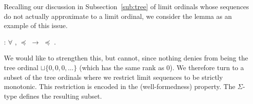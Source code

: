 Recalling our discussion in Subsection~\ref{sub:tree} of limit ordinals whose
sequences do not actually approximate to a limit ordinal, we consider the
lemma
as an example of this issue.
\begin{singlespace}
\begin{coqdoccode}
\coqdocnoindent
{}
:
\ensuremath{\forall} \coqdocvar{\ensuremath{\alpha}} \coqdocvar{\ensuremath{\beta}},
\coqdocvariable{\ensuremath{\alpha}} \ensuremath{\preceq}
\ensuremath{\rightarrow}
\coqdocvariable{\ensuremath{\alpha}} \ensuremath{\preceq}
\coqdocvariable{\ensuremath{\beta}}.\coqdoceol
\end{coqdoccode}
\end{singlespace}
We would like to strengthen this, but cannot, since nothing denies
\coqdocvariable{$\alpha$} from being the tree ordinal $\sqcup \{ 0, 0, 0,
\ldots \}$ (which has the same rank as $0$). We therefore turn to a subset of
the tree ordinals where we restrict limit sequences to be strictly
monotonic. This restriction is encoded in the
 (well-formedness)
property. The $\Sigma$-type
 defines
the resulting subset.
